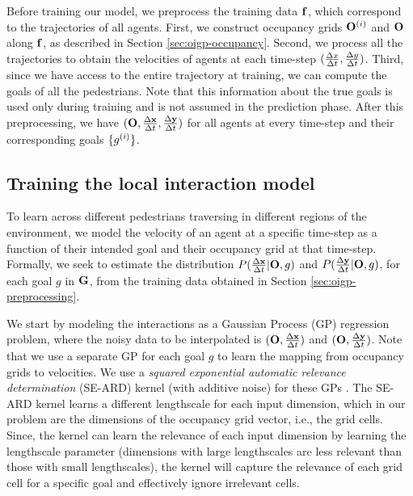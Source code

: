 %
%
%
%
%
%
%
%
%
%

%
%
%
%
%
%
Before training our model, we preprocess the training data $\mathbf{f}$,
which correspond to the trajectories of all agents. First, we
construct occupancy grids $\mathbf{O}^{(i)}$ and $\mathbf{O}$ along $\mathbf{f}$, as described in
Section \ref{sec:oigp-occupancy}. Second, we process all the trajectories
to obtain the velocities of agents at each time-step $(\frac{\Delta x}{\Delta t},
\frac{\Delta y}{\Delta t})$. Third, since we have access to the entire trajectory at
training, we can compute the goals of all the pedestrians.  Note that
this information about the true goals is used only during training and
is not assumed in the prediction phase.  After this preprocessing, we
have $(\mathbf{O}, \frac{\Delta \mathbf{x}}{\Delta t}, \frac{\Delta \mathbf{y}}{\Delta t})$ for all agents at every time-step and
their corresponding goals $\{g^{(i)}\}$.%

\subsection{Training the local interaction model}
\label{sec:oigp-train}

To learn across different pedestrians traversing in different regions
of the environment, we model the velocity of an agent at a specific
time-step as a function of their intended goal and their occupancy
grid at that time-step. Formally, we seek to estimate the distribution
$P(\frac{\Delta \mathbf{x}}{\Delta t}| \mathbf{O}, g)$ and $P(\frac{\Delta \mathbf{y}}{\Delta t}| \mathbf{O}, g)$, for each goal $g$
in $\mathbf{G}$, from the training data obtained in Section
\ref{sec:oigp-preprocessing}.

We start by modeling the interactions as a Gaussian Process (GP)
regression problem, where the noisy data to be interpolated is
$(\mathbf{O}, \frac{\Delta \mathbf{x}}{\Delta t})$ and $(\mathbf{O}, \frac{\Delta \mathbf{y}}{\Delta t})$. Note that we use a separate
GP for each goal $g$ to learn the mapping from occupancy grids to
velocities. We use a \textit{squared exponential automatic relevance
  determination} (SE-ARD) kernel (with additive noise) for these GPs
\cite{rasmussen06}.  The SE-ARD kernel learns a different lengthscale
for each input dimension, which in our problem are the dimensions of
the occupancy grid vector, i.e., the grid cells. Since, the kernel can
learn the relevance of each input dimension by learning the
lengthscale parameter \cite{rasmussen06} (dimensions with large
lengthscales are less relevant than those with small lengthscales), the
kernel will capture the relevance of each grid cell for a specific
goal and effectively ignore irrelevant cells.
%
%
%
%
%
%
%
%
%
%
%
%


